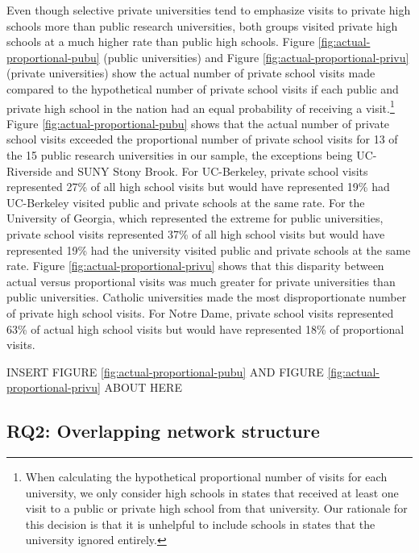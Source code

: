 \documentclass[
  12pt,
]{article}
\begin{document}
Even though selective private universities tend to emphasize visits to private high schools more than public research universities, both groups visited private high schools at a much higher rate than public high schools. Figure \ref{fig:actual-proportional-pubu} (public universities) and Figure \ref{fig:actual-proportional-privu} (private universities) show the actual number of private school visits made compared to the hypothetical number of private school visits if each public and private high school in the nation had an equal probability of receiving a visit.\footnote{When calculating the hypothetical proportional number of visits for each university, we only consider high schools in states that received at least one visit to a public or private high school from that university. Our rationale for this decision is that it is unhelpful to include schools in states that the university ignored entirely.} Figure \ref{fig:actual-proportional-pubu} shows that the actual number of private school visits exceeded the proportional number of private school visits for 13 of the 15 public research universities in our sample, the exceptions being UC-Riverside and SUNY Stony Brook. For UC-Berkeley, private school visits represented 27\% of all high school visits but would have represented 19\% had UC-Berkeley visited public and private schools at the same rate. For the University of Georgia, which represented the extreme for public universities, private school visits represented 37\% of all high school visits but would have represented 19\% had the university visited public and private schools at the same rate. Figure \ref{fig:actual-proportional-privu} shows that this disparity between actual versus proportional visits was much greater for private universities than public universities. Catholic universities made the most disproportionate number of private high school visits. For Notre Dame, private school visits represented 63\% of actual high school visits but would have represented 18\% of proportional visits.

INSERT FIGURE \ref{fig:actual-proportional-pubu} AND FIGURE \ref{fig:actual-proportional-privu} ABOUT HERE

\hypertarget{rq2-overlapping-network-structure}{%
\subsection{RQ2: Overlapping network structure}\label{rq2-overlapping-network-structure}}
\end{document}
